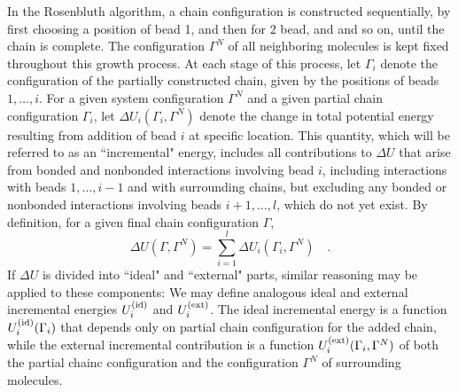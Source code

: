 \documentclass[12pt]{article}
\newcommand\system{\Gamma^{N}}
\newcommand\chain{\Gamma}
\newcommand\delU{\Delta U}
\newcommand\Uid{U^{({\rm id})}}
\newcommand\Uext{U^{({\rm ext})}}
\newcommand\nbead{l}
\begin{document}
In the Rosenbluth algorithm, a chain configuration is constructed sequentially, by first choosing a position of bead 1, and then for 2 bead, and and so on, until the chain is complete.  The configuration $\system$ of all neighboring molecules is kept fixed throughout this growth process. At each stage of this process, let $\chain_{i}$ denote the configuration of the partially constructed chain, given by the positions of beads $1,\ldots,i$. For a given system configuration $\system$ and a given partial chain configuration $\chain_{i}$, let $\delU_{i}(\chain_{i}, \system)$ denote the change in total potential energy resulting from addition of bead $i$ at specific location. This quantity, which will be referred to as an ``incremental" energy, includes all contributions to $\delU$ that arise from bonded and nonbonded interactions involving bead $i$, including interactions with beads $1,\ldots, i-1$ and with surrounding chains, but excluding any bonded or nonbonded interactions involving beads $i+1,\ldots,\nbead$, which do not yet exist. By definition, for a given final chain configuration $\chain$,
\begin{equation}
   \delU(\chain, \system) 
   = \sum_{i=1}^{\nbead} \delU_{i}(\chain_i, \system) 
   \quad.
\end{equation}
If $\delU$ is divided into ``ideal" and ``external" parts, similar reasoning may be applied to these components: We may define analogous ideal and external incremental energies $\Uid_{i}$ and $\Uext_{i}$. The ideal incremental energy is a function $\Uid_{i}(\chain_{i})$ that depends only on partial chain configuration for the added chain, while the external incremental contribution is a function $\Uext_{i}(\chain_{i}, \system)$ of both the partial chainc configuration and the configuration $\system$ of surrounding molecules.
\end{document}
